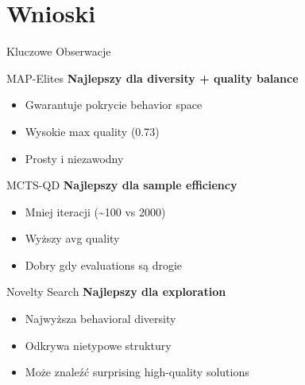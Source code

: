 \documentclass{beamer}
\begin{document}
\section{Wnioski}

\begin{frame}{Kluczowe Obserwacje}
\begin{exampleblock}{MAP-Elites}
\textbf{Najlepszy dla diversity + quality balance}
\begin{itemize}
\item Gwarantuje pokrycie behavior space
\item Wysokie max quality (0.73)
\item Prosty i niezawodny
\end{itemize}
\end{exampleblock}

\begin{exampleblock}{MCTS-QD}
\textbf{Najlepszy dla sample efficiency}
\begin{itemize}
\item Mniej iteracji (\textasciitilde100 vs 2000)
\item Wyższy avg quality
\item Dobry gdy evaluations są drogie
\end{itemize}
\end{exampleblock}

\begin{exampleblock}{Novelty Search}
\textbf{Najlepszy dla exploration}
\begin{itemize}
\item Najwyższa behavioral diversity
\item Odkrywa nietypowe struktury
\item Może znaleźć surprising high-quality solutions
\end{itemize}
\end{exampleblock}
\end{frame}
\end{document}
